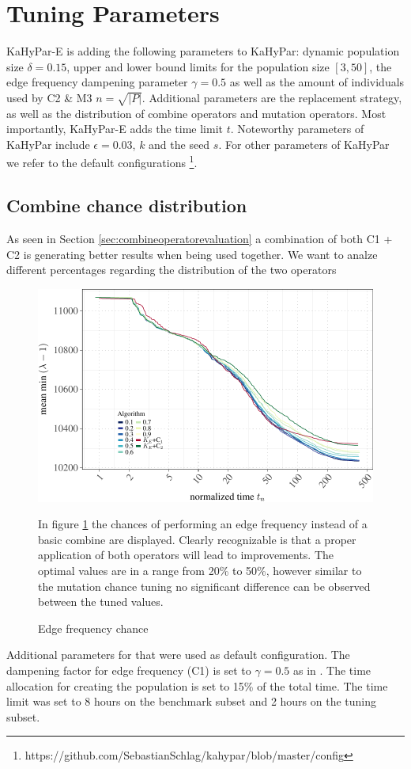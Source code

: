 \documentclass[a4paper,12pt,titlepage, BCOR7mm,headsepline]{scrbook}
\numberwithin{equation}{section}
\begin{document}
\section{Tuning Parameters}
KaHyPar-E is adding the following parameters to KaHyPar: dynamic population size $\delta = 0.15$, upper and lower bound limits for the population size $[3,50]$, the edge frequency dampening parameter $\gamma = 0.5$ as well as the amount of individuals used by C2 \& M3 $n = \sqrt{|P|}$. Additional parameters are the replacement strategy, as well as the distribution of combine operators and mutation operators. Most importantly, KaHyPar-E adds the time limit $t$. Noteworthy parameters of KaHyPar include $\epsilon = 0.03$, $k$ and the seed $s$. For other parameters of KaHyPar we refer to the default configurations \footnote{https://github.com/SebastianSchlag/kahypar/blob/master/config}. 
\subsection{Combine chance distribution}
As seen in Section \ref{sec:combineoperatorevaluation} a combination of both C1 + C2 is generating better results when being used together. We want to analze different percentages regarding the distribution of the two operators
\begin{figure}[H]

\begin{center}
\includegraphics{rnw/tuning_subset_plots/edge_tuning_plot-1}\caption{Edge frequency chance}\label{edge_tuning}
\end{center}
In figure \ref{edge_tuning} the chances of performing an edge frequency instead of a basic combine are displayed. Clearly recognizable is that a proper application of both operators will lead to improvements. The optimal values are in a range from 20\% to 50\%, however similar to the mutation chance tuning no significant difference can be observed between the tuned values.  
\end{figure}
Additional parameters for that were used as default configuration. The dampening factor for edge frequency (C1) is set to $\gamma = 0.5$ as in \cite{wichlund1998multilevel}. The time allocation for creating the population is set to 15\% of the total time. The time limit was set to 8 hours on the benchmark subset and 2 hours on the tuning subset.
\end{document}

